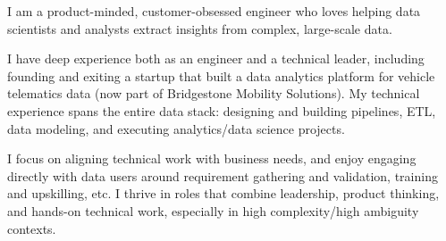 

\begin{cvparagraph}


I am a product-minded, customer-obsessed engineer who loves helping data scientists and analysts extract insights from complex, large-scale data.

I have deep experience both as an engineer and a technical leader, including founding and exiting a startup that built a data analytics platform for vehicle telematics data (now part of Bridgestone Mobility Solutions). My technical experience spans the entire data stack: designing and building pipelines, ETL, data modeling, and executing analytics/data science projects.

I focus on aligning technical work with business needs, and enjoy engaging directly with data users around requirement gathering and validation, training and upskilling, etc. I thrive in roles that combine leadership, product thinking, and hands-on technical work, especially in high complexity/high ambiguity contexts.

\end{cvparagraph}

